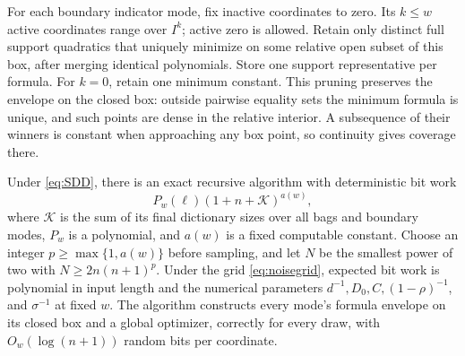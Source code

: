 For each boundary indicator mode, fix inactive coordinates to zero. Its
$k\le w$ active coordinates range over $I^k$; active zero is allowed.
Retain only distinct full support quadratics that uniquely minimize on some
relative open subset of this box, after merging identical polynomials.
Store one support representative per formula. For $k=0$, retain one minimum
constant. This pruning preserves the envelope on the closed box: outside
pairwise equality sets the minimum formula is unique, and such points are
dense in the relative interior. A subsequence of their winners is constant
when approaching any box point, so continuity gives coverage there.

\begin{theorem}\label{thm:recursive}
Under \eqref{eq:SDD}, there is an exact recursive algorithm with deterministic
bit work
\begin{equation}\label{eq:CADwork}
 P_w(\ell)(1+n+\mathcal K)^{a(w)},
\end{equation}
where $\mathcal K$ is the sum of its final dictionary sizes over all bags
and boundary modes, $P_w$ is a polynomial, and $a(w)$ is a fixed computable
constant. Choose an integer $p\ge\max\{1,a(w)\}$ before sampling, and
let $N$ be the smallest power of two with $N\ge2n(n+1)^p$.
Under the grid \eqref{eq:noisegrid}, expected bit work is polynomial in
input length and the numerical parameters $d^{-1},D_0,C,(1-\rho)^{-1}$,
and $\sigma^{-1}$ at fixed $w$. The algorithm constructs every mode's
formula envelope on its closed box and a global optimizer, correctly for
every draw, with $O_w(\log(n+1))$ random bits per coordinate.
\end{theorem}
